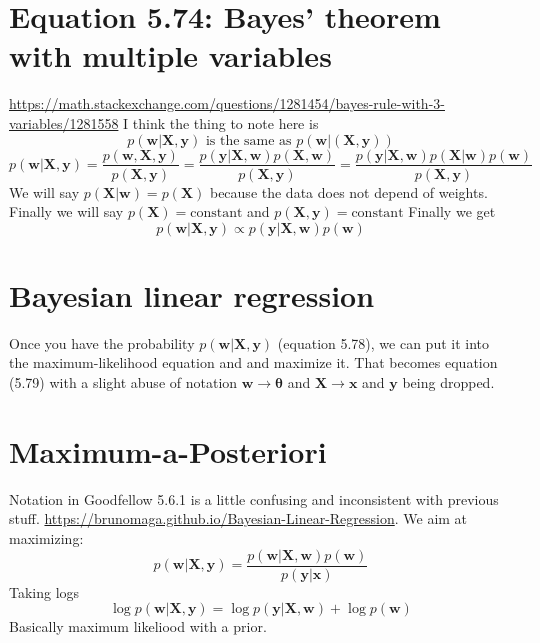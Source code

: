 \documentclass{article}
\newcommand{\beq}{\begin{equation}}
\newcommand{\eeq}{\end{equation}}
\begin{document}
\section{Equation 5.74: Bayes' theorem with multiple variables}
\url{https://math.stackexchange.com/questions/1281454/bayes-rule-with-3-variables/1281558}
I think the thing to note here is
\beq
p(\pmb{w}|\pmb{X},\pmb{y}) \text { is the same as }   p(\pmb{w}|(\pmb{X},\pmb{y})) 
\eeq
\beq
p(\pmb{w}|\pmb{X},\pmb{y}) = \frac{p(\pmb{w},\pmb{X},\pmb{y})}{p(\pmb{X},\pmb{y})} = \frac{p(\pmb{y}|\pmb{X},\pmb{w})p(\pmb{X},\pmb{w})}{p(\pmb{X},\pmb{y})}
=\frac{p(\pmb{y}|\pmb{X},\pmb{w})p(\pmb{X}|\pmb{w})p(\pmb{w})}{p(\pmb{X},\pmb{y})}
\eeq
We will say $p(\pmb{X}|\pmb{w})=p(\pmb{X})$ because the data does not depend of weights. Finally we will say $p(\pmb{X})=\text{constant}$ and $p(\pmb{X},\pmb{y})=\text{constant}$
Finally we get
\beq
p(\pmb{w}|\pmb{X},\pmb{y}) \propto  p(\pmb{y}|\pmb{X},\pmb{w})p(\pmb{w})
\eeq
\section{Bayesian linear regression}
Once you have the probability $p(\pmb{w}|\pmb{X},\pmb{y})$ (equation 5.78), we can put it into the maximum-likelihood equation and and maximize it. That becomes equation (5.79) with a slight abuse of notation $\pmb{w}\rightarrow{\pmb{\theta}}$ and $\pmb{X}\rightarrow{\pmb{x}}$ and $\pmb{y}$ being dropped.
%
%
%
\section{Maximum-a-Posteriori}
Notation in Goodfellow 5.6.1 is a little confusing and inconsistent with previous stuff. \url{https://brunomaga.github.io/Bayesian-Linear-Regression}. We aim at maximizing:
\beq
p(\pmb{w}|\pmb{X},\pmb{y}) = \frac{p(\pmb{w}|\pmb{X},\pmb{w})p(\pmb{w})}{p(\pmb{y}|\pmb{x})}
\eeq
%
Taking logs
\beq
\log{p(\pmb{w}|\pmb{X},\pmb{y})} = \log{p(\pmb{y}|\pmb{X},\pmb{w})} + \log{p(\pmb{w})}
\eeq
Basically maximum likeliood with a prior.
%
%
\end{document}
